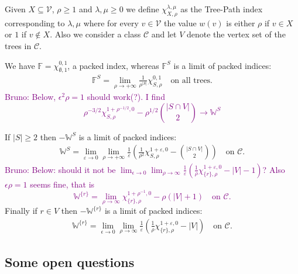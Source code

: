 \documentclass[11 pt]{modarticle}
\newcommand{\vset}{\mathcal{V}}
\newcommand{\wmap}{w}
\newcommand{\size}[1]{|#1|}
\newcommand{\tclass}{\mathcal{C}}
\newcommand{\bldcomment}[1]{\textcolor{purple}{{\footnotesize Bruno:} #1}}
\begin{document}
Given $X \subseteq \vset$, $\rho \geq 1$ and $\lambda, \mu \geq 0$ we define $\chi^{\lambda, \mu}_{X, \rho}$ as the Tree-Path index corresponding to $\lambda, \mu$ where for every $v \in \vset$ the value $\wmap(v)$ is either $\rho$ if $v \in X$ or $1$ if $v \notin X$. Also we consider a class $\tclass$ and let $V$ denote the vertex set of the trees in $\tclass$.


We have $\mathbb{F} = \chi^{0,1}_{\emptyset, 1}$, a packed index, whereas $\mathbb{F}^S$ is a limit of packed indices:
\begin{eqnarray*}
	\mathbb{F}^S = \lim_{\rho\to +\infty} \frac{1}{\rho^{\size{S}}} \chi^{0,1}_{S,\rho} \quad \text{on all trees.}
\end{eqnarray*}
\bldcomment{Below, $\epsilon^2 \rho = 1$ should work(?). I find
\[ \rho^{-3/2}\chi^{1 + \rho^{-1/2},0}_{S,\rho} - \rho^{1/2} \binom{\size{S \cap V}}{2} \to \mathbb{W}^S\]}

If $\size{S} \geq 2$ then $-\mathbb{W}^S$ is a limit of packed indices:
\begin{eqnarray*}
	\mathbb{W}^S = \lim_{\varepsilon \to 0} \lim_{\rho\to +\infty} \frac{1}{\varepsilon}\left(\frac{1}{\rho^2} \chi^{1+\varepsilon,0}_{S,\rho} - {\binom{\size{S \cap V}}{2}} \right) \quad \text{on $\tclass$.}
\end{eqnarray*}
\bldcomment{Below: should it not be $\lim_{\epsilon \to 0} \lim_{\rho\to\infty}\frac{1}{\varepsilon}\left(\frac{1}{\rho}\chi^{1+\varepsilon,0}_{\{r\},\rho}-\size{V} - 1\right)$? Also $\epsilon \rho = 1$ seems fine, that is
\[
	\mathbb{W}^{\{r\}} = \lim_{\rho\to\infty}\chi^{1+\rho^{-1},0}_{\{r\},\rho}- \rho \left(\size{V} + 1\right) \quad \text{on $\tclass$}.
\]}
Finally if $r \in V$ then $-\mathbb{W}^{\{r\}}$ is a limit of packed indices:
\begin{eqnarray*}
	\mathbb{W}^{\{r\}} = \lim_{\epsilon \to 0} \lim_{\rho\to\infty}\frac{1}{\varepsilon}\left(\frac{1}{\rho}\chi^{1+\varepsilon,0}_{\{r\},\rho}-\size{V}\right) \quad \text{on $\tclass$}.
\end{eqnarray*}
\subsection{Some open questions}
\end{document}
